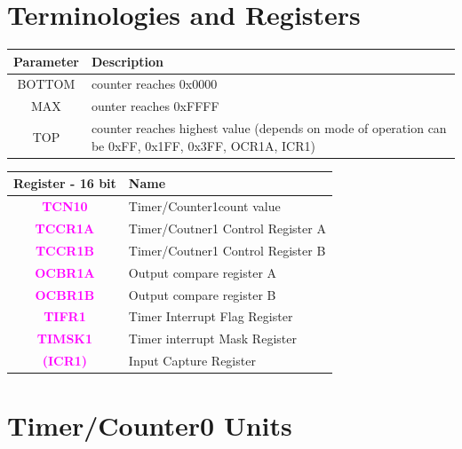 \documentclass{article}
\newcommand{\regFormat}[1]{\textbf{\textcolor{magenta}{#1}}}
\begin{document}
\section{Terminologies and Registers}
\begin{minipage}{0.45\textwidth}
    \begin{tabular}{c|p{5.5cm}}
        \textbf{Parameter} & \textbf{Description}\\
        \hline
        BOTTOM & counter reaches 0x0000\\
        MAX & ounter reaches 0xFFFF\\
        TOP & counter reaches highest value (depends on mode of operation can be 0xFF, 0x1FF, 0x3FF, OCR1A, ICR1)
    \end{tabular}
\end{minipage}
\begin{minipage}{0.5\textwidth}
    \begin{tabular}{c|p{5.5cm}}
        \textbf{Register - 16 bit} & \textbf{Name}\\
        \hline
        \regFormat{TCN10} & Timer/Counter1count value\\
        \regFormat{TCCR1A} & Timer/Coutner1 Control Register A\\
        \regFormat{TCCR1B} & Timer/Coutner1 Control Register B\\
        \regFormat{OCBR1A} & Output compare register A\\
        \regFormat{OCBR1B} & Output compare register B\\
        \regFormat{TIFR1} & Timer Interrupt Flag Register\\
        \regFormat{TIMSK1} & Timer interrupt Mask Register\\
        \regFormat{(ICR1)} & Input Capture Register\\
    \end{tabular}
\end{minipage}

\section{Timer/Counter0 Units}
\end{document}
